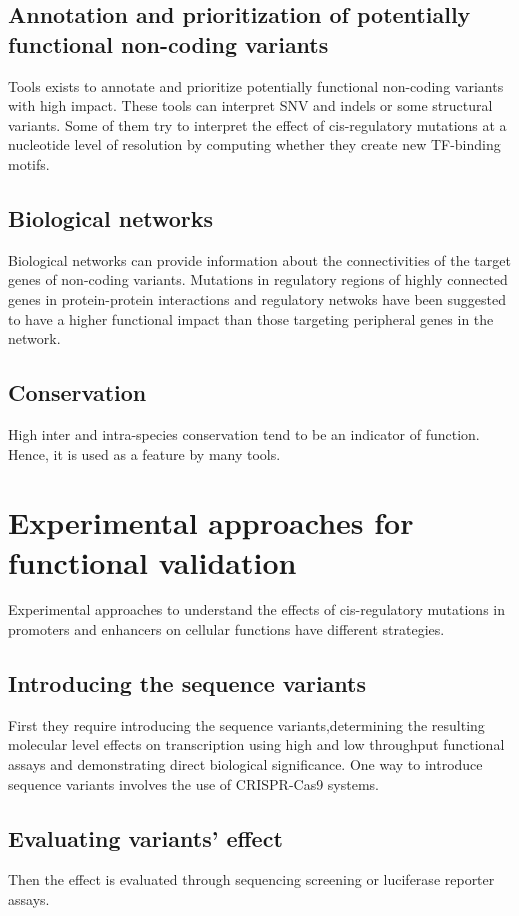 	\subsection{Annotation and prioritization of potentially functional non-coding variants}
	Tools exists to annotate and prioritize potentially functional non-coding variants with high impact.
	These tools can interpret SNV and indels or some structural variants.
	Some of them try to interpret the effect of cis-regulatory mutations at a nucleotide level of resolution by computing whether they create new TF-binding motifs.

	\subsection{Biological networks}
	Biological networks can provide information about the connectivities of the target genes of non-coding variants.
	Mutations in regulatory regions of highly connected genes in protein-protein interactions and regulatory netwoks have been suggested to have a higher functional impact than those targeting peripheral genes in the network.

	\subsection{Conservation}
	High inter and intra-species conservation tend to be an indicator of function.
	Hence, it is used as a feature by many tools.

\section{Experimental approaches for functional validation}
Experimental approaches to understand the effects of cis-regulatory mutations in promoters and enhancers on cellular functions have different strategies.

	\subsection{Introducing the sequence variants}
	First they require introducing the sequence variants,determining the resulting molecular level effects on transcription using high and low throughput functional assays and demonstrating direct biological significance.
	One way to introduce sequence variants involves the use of CRISPR-Cas9 systems.

	\subsection{Evaluating variants' effect}
	Then the effect is evaluated through sequencing screening or luciferase reporter assays.

